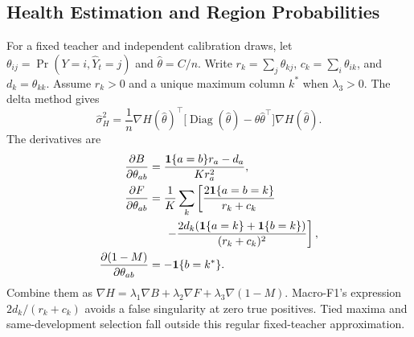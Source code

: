\documentclass[journal]{IEEEtran}
\begin{document}
\subsection{Health Estimation and Region Probabilities}
For a fixed teacher and independent calibration draws, let $\theta_{ij}=\Pr(Y=i,\widehat Y_t=j)$ and $\widehat\theta=C/n$. Write $r_k=\sum_j\theta_{kj}$, $c_k=\sum_i\theta_{ik}$, and $d_k=\theta_{kk}$. Assume $r_k>0$ and a unique maximum column $k^*$ when $\lambda_3>0$. The delta method gives
\begin{equation}
\widehat\sigma_H^2=\frac1n\nabla H(\widehat\theta)^\top
\big[\operatorname{Diag}(\widehat\theta)-\widehat\theta\widehat\theta^\top\big]
\nabla H(\widehat\theta).
\label{eq:health_se}
\end{equation}
The derivatives are
\begin{align}
\frac{\partial B}{\partial\theta_{ab}}
&=\frac{\mathbf1\{a=b\}r_a-d_a}{K r_a^2},\\
\frac{\partial F}{\partial\theta_{ab}}
&=\frac1K\sum_k\left[\frac{2\mathbf1\{a=b=k\}}{r_k+c_k}\right.\nonumber\\
&\hspace{5mm}\left.-\frac{2d_k(\mathbf1\{a=k\}+\mathbf1\{b=k\})}{(r_k+c_k)^2}\right],\\
\frac{\partial(1-M)}{\partial\theta_{ab}}&=-\mathbf1\{b=k^*\}.
\end{align}
Combine them as $\nabla H=\lambda_1\nabla B+\lambda_2\nabla F+\lambda_3\nabla(1-M)$. Macro-F1's expression $2d_k/(r_k+c_k)$ avoids a false singularity at zero true positives. Tied maxima and same-development selection fall outside this regular fixed-teacher approximation.
\end{document}
